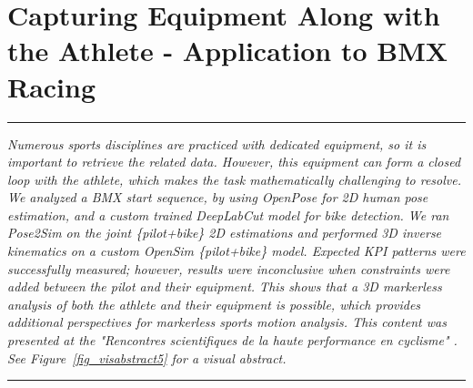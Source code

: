 
\lhead[\fancyplain{}{\leftmark}]%
      {\fancyplain{}{}} %
\chead[\fancyplain{}{}]%
      {\fancyplain{}{}}
\rhead[\fancyplain{}{}]%
      {\fancyplain{}{\rightmark}}%
\lfoot[\fancyplain{}{}]%
      {\fancyplain{}{}}
\cfoot[\fancyplain{}{\thepage}]%
      {\fancyplain{}{\thepage}} %
\rfoot[\fancyplain{}{}]%
     {\fancyplain{}{\scriptsize}}



\chapter{Capturing Equipment Along with the Athlete - Application to BMX Racing}
\label{ch:7}


\begin{center}
\rule{0.7\linewidth}{.5pt}
\begin{minipage}{0.7\linewidth}
\smallskip

\textit{Numerous sports disciplines are practiced with dedicated equipment, so it is important to retrieve the related data. However, this equipment can form a closed loop with the athlete, which makes the task mathematically challenging to resolve. \newline\newline
We analyzed a BMX start sequence, by using OpenPose for 2D human pose estimation, and a custom trained DeepLabCut model for bike detection. We ran Pose2Sim on the joint \{pilot+bike\} 2D estimations and performed 3D inverse kinematics on a custom OpenSim \{pilot+bike\} model. Expected KPI patterns were successfully measured; however, results were inconclusive when constraints were added between the pilot and their equipment. This shows that a 3D markerless analysis of both the athlete and their equipment is possible, which provides additional perspectives for markerless sports motion analysis.\newline\newline
This content was presented at the "Rencontres scientifiques de la haute performance en cyclisme" \cite{Pagnon2022e}. See Figure~\ref{fig_visabstract5} for a visual abstract.
}

\end{minipage}
\smallskip
\rule{0.7\linewidth}{.5pt}
\end{center}

